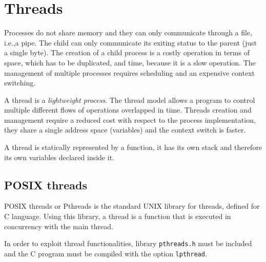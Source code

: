 \chapter{Threads}
Processes do not share memory and they can only communicate through a file, i.e.,\@ a pipe. The child can only communicate its exiting status to the parent (just a single byte). The creation of a child process is a costly operation in terms of space, which has to be duplicated, and time, because it is a slow operation. The management of multiple processes requires scheduling and an expensive context switching.

A thread is a \textit{lightweight process}. The thread model allows a program to control multiple different flows of operations overlapped in time. Threads creation and management require a reduced cost with respect to the process implementation, they share a single address space (variables) and the context switch is faster.

A thread is statically represented by a function, it has its own stack and therefore its own variables declared inside it.

\section{POSIX threads}
POSIX threads or Pthreads is the standard UNIX library for threads, defined for C language. Using this library, a thread is a function that is executed in concurrency with the main thread.

In order to exploit thread functionalities, library \texttt{pthreads.h} must be included and the C program must be compiled with the option \texttt{lpthread}.

